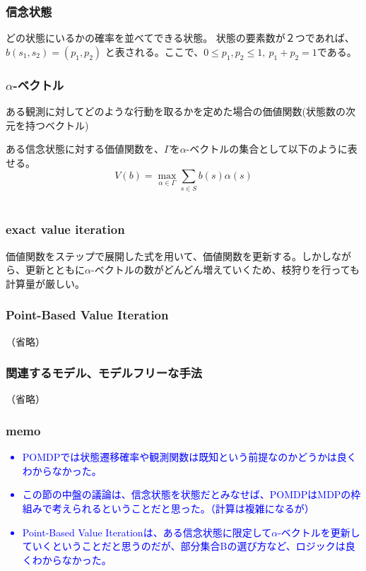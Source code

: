 \documentclass[]{jarticle}
\begin{document}
\subsubsection*{信念状態}
どの状態にいるかの確率を並べてできる状態。
状態の要素数が２つであれば、$b(s_1, s_2) = (p_1, p_2)$ と表される。ここで、$0 \leq p_1, p_2 \leq 1, \: p_1 + p_2 = 1$である。

\subsubsection*{$\alpha$-ベクトル}
ある観測に対してどのような行動を取るかを定めた場合の価値関数(状態数の次元を持つベクトル) 

ある信念状態に対する価値関数を、$\Gamma$を$\alpha$-ベクトルの集合として以下のように表せる。
\begin{equation*}
V(b) = \underset{\alpha \in \Gamma}{\max}\sum_{s \in S}b(s)\alpha(s)
\end{equation*}\\

\subsubsection*{exact value iteration}
価値関数をステップで展開した式を用いて、価値関数を更新する。しかしながら、更新とともに$\alpha$-ベクトルの数がどんどん増えていくため、枝狩りを行っても計算量が厳しい。

\subsubsection*{Point-Based Value Iteration}
（省略）

\subsubsection*{関連するモデル、モデルフリーな手法}
（省略）
	
\subsubsection*{memo}
\textcolor{blue}{\begin{itemize}
		\item POMDPでは状態遷移確率や観測関数は既知という前提なのかどうかは良くわからなかった。
		\item この節の中盤の議論は、信念状態を状態だとみなせば、POMDPはMDPの枠組みで考えられるということだと思った。（計算は複雑になるが）
		\item Point-Based Value Iterationは、ある信念状態に限定して$\alpha$-ベクトルを更新していくということだと思うのだが、部分集合Bの選び方など、ロジックは良くわからなかった。
\end{itemize}}
\end{document}
